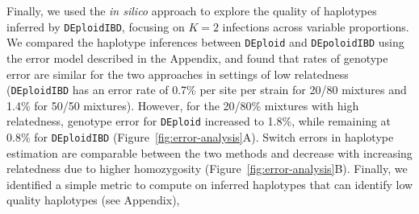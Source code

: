 \documentclass[9pt,lineno]{elife}
\begin{document}
Finally, we used the \emph{in silico} approach to explore the quality of haplotypes inferred by \texttt{DEploidIBD}, focusing on $K=2$ infections across variable proportions. We compared the haplotype inferences between \texttt{DEploid} and \texttt{DEpoloidIBD} using the error model described in the Appendix, and found that rates of genotype error are similar for the two approaches in settings of low relatedness ({\tt DEploidIBD} has an error rate of 0.7\% per site per strain for 20/80 mixtures and 1.4\% for 50/50 mixtures).  However, for the 20/80\% mixtures with high relatedness, genotype error for \texttt{DEploid} increased to 1.8\%, while remaining at 0.8\% for \texttt{DEploidIBD} (Figure~\ref{fig:error-analysis}A). Switch errors in haplotype estimation are comparable between the two methods and decrease with increasing relatedness due to higher homozygosity (Figure~\ref{fig:error-analysis}B). Finally, we identified a simple metric to compute on inferred haplotypes that can identify low quality haplotypes (see Appendix),
\end{document}
